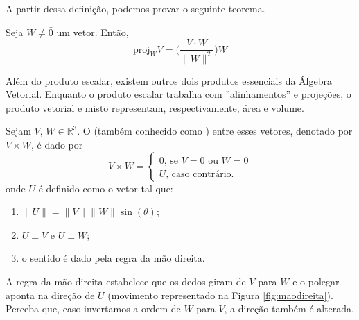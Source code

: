 \documentclass[../main.tex]{subfiles}
\begin{document}
		A partir dessa definição, podemos provar o seguinte teorema.
		\begin{teorema}
			Seja $W\neq \bar{0}$ um vetor. Então,
			\[
			\text{proj}_W V = \bigg(\frac{V\cdot W}{\|W\|^2}\bigg)W
			\]
		\end{teorema}
		Além do produto escalar, existem outros dois produtos essenciais da Álgebra Vetorial. Enquanto o produto escalar trabalha com ''alinhamentos'' e projeções, o produto vetorial e misto representam, respectivamente, área e volume.
		\begin{definicao}
			Sejam $V,\, W\in \mathbb{R}^3$. O  (também conhecido como ) entre esses vetores, denotado por $V\times W$, é dado por
			\[
			V\times W = \begin{cases}
				\bar{0}\text{, se $V=\bar{0}$ ou $W=\bar{0}$}\\
				U\text{, caso contrário.}
			\end{cases}
			\]
			onde $U$ é definido como o vetor tal que:
			\begin{enumerate}[label=\roman*)]
				\item $\|U\|=\|V\|\|W\|\sin(\theta)$;
				\item $U\perp V$ e $U\perp W$;
				\item o sentido é dado pela regra da mão direita.
			\end{enumerate}
		\end{definicao}
		A regra da mão direita estabelece que os dedos giram de $V$ para $W$ e o polegar aponta na direção de $U$ (movimento representado na Figura \ref{fig:maodireita}). Perceba que, caso invertamos a ordem de $W$ para $V$, a direção também é alterada.
		
\end{document}
